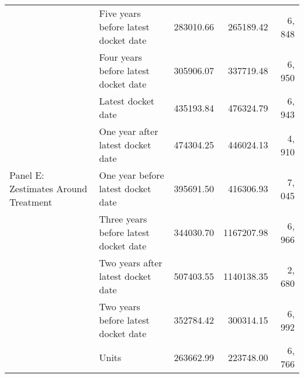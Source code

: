 \begin{tabular}{llrrr}
\cline{1-5}
\multirow[c]{9}{*}{Panel E: Zestimates Around Treatment} & Five years before latest docket date & 283010.66 & 265189.42 & 6, 848 \\
 & Four years before latest docket date & 305906.07 & 337719.48 & 6, 950 \\
 & Latest docket date & 435193.84 & 476324.79 & 6, 943 \\
 & One year after latest docket date & 474304.25 & 446024.13 & 4, 910 \\
 & One year before latest docket date & 395691.50 & 416306.93 & 7, 045 \\
 & Three years before latest docket date & 344030.70 & 1167207.98 & 6, 966 \\
 & Two years after latest docket date & 507403.55 & 1140138.35 & 2, 680 \\
 & Two years before latest docket date & 352784.42 & 300314.15 & 6, 992 \\
 & Units & 263662.99 & 223748.00 & 6, 766 \\
\cline{1-5}
\bottomrule
\end{tabular}

